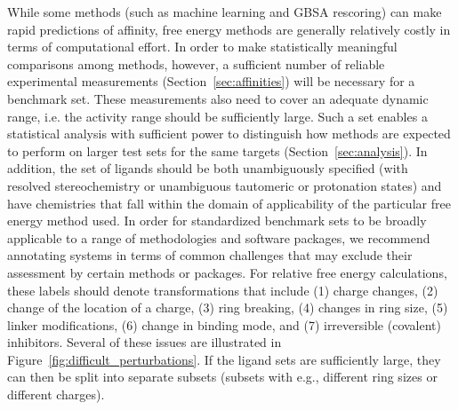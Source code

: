 \documentclass[9pt,bestpractices,pubversion]{livecoms}
\begin{document}
While some methods (such as machine learning and GBSA rescoring) can make rapid predictions of affinity, free energy methods are generally relatively costly in terms of computational effort. 
In order to make statistically meaningful comparisons among methods, however, a sufficient number of reliable experimental measurements (Section~\ref{sec:affinities}) will be necessary for a benchmark set. These measurements also need to cover an adequate dynamic range, i.e. the activity range should be sufficiently large.   Such a set enables a statistical analysis with sufficient power to distinguish how methods are expected to perform on larger test sets for the same targets (Section~\ref{sec:analysis}).
In addition, the set of ligands should be both unambiguously specified (with resolved stereochemistry or unambiguous tautomeric or protonation states) and have chemistries that fall within the domain of applicability of the particular free energy method used. 
%
In order for standardized benchmark sets to be broadly applicable to a range of methodologies and software packages, we recommend annotating systems in terms of common challenges that may exclude their assessment by certain methods or packages.
For relative free energy calculations, these labels should denote transformations that include
(1) charge changes, 
(2) change of the location of a charge,
(3) ring breaking,
(4) changes in ring size, 
(5) linker modifications,
(6) change in binding mode, 
and (7) irreversible (covalent) inhibitors. 
Several of these issues are illustrated in Figure~\ref{fig:difficult_perturbations}.
%
If the ligand sets are sufficiently large, they can then be split into separate subsets (subsets with e.g., different ring sizes or different charges).
\end{document}
